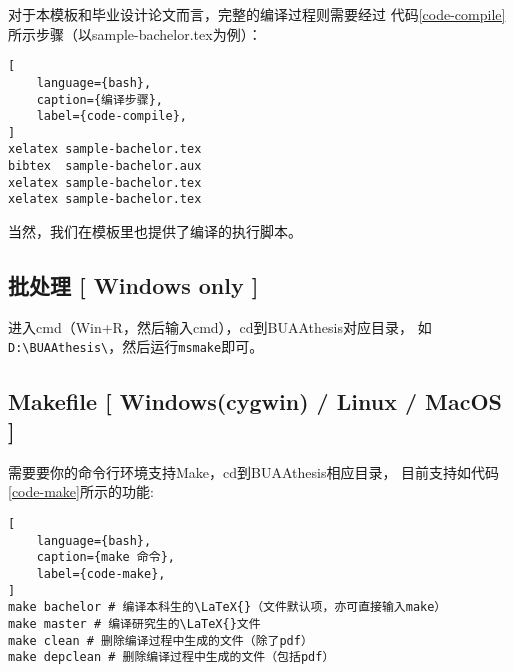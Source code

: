对于本模板和毕业设计论文而言，完整的编译过程则需要经过
代码\ref{code-compile}所示步骤（以sample-bachelor.tex为例）：
\begin{lstlisting}[
    language={bash},
    caption={编译步骤},
    label={code-compile},
]
xelatex sample-bachelor.tex
bibtex  sample-bachelor.aux
xelatex sample-bachelor.tex
xelatex sample-bachelor.tex
\end{lstlisting}
当然，我们在模板里也提供了编译的执行脚本。

\subsection{批处理 [ Windows only ]}

进入cmd（Win+R，然后输入cmd），cd到BUAAthesis对应目录，
如{\verb|D:\BUAAthesis\|}，然后运行{\verb|msmake|}即可。

\subsection{Makefile [ Windows(cygwin) / Linux / MacOS ]}
需要要你的命令行环境支持Make，cd到BUAAthesis相应目录，
目前支持如代码\ref{code-make}所示的功能:
\begin{lstlisting}[
    language={bash},
    caption={make 命令},
    label={code-make},
]
make bachelor # 编译本科生的\LaTeX{}（文件默认项，亦可直接输入make）
make master # 编译研究生的\LaTeX{}文件
make clean # 删除编译过程中生成的文件（除了pdf）
make depclean # 删除编译过程中生成的文件（包括pdf）
\end{lstlisting}
